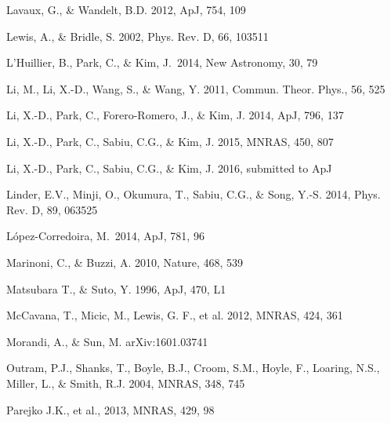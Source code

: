 \documentclass[iop]{emulateapj}
\begin{document}
\begin{thebibliography}{}
Lavaux, G., \& Wandelt, B.D. 2012, ApJ, 754, 109  


Lewis, A., \& Bridle, S. 2002, Phys. Rev. D, 66, 103511

L'Huillier, B., Park, C., \& Kim, J.\ 2014, New Astronomy, 30, 79 

Li, M., Li, X.-D., Wang, S., \& Wang, Y. 2011, Commun. Theor. Phys., 56, 525

Li, X.-D., Park, C., Forero-Romero, J., \& Kim, J. 2014, ApJ, 796, 137

Li, X.-D., Park, C., Sabiu, C.G., \& Kim, J. 2015, MNRAS, 450, 807 

Li, X.-D., Park, C., Sabiu, C.G., \& Kim, J. 2016, submitted to ApJ



Linder, E.V., Minji, O., Okumura, T., Sabiu, C.G., \& Song, Y.-S. 2014, Phys. Rev. D, 89, 063525  

L{\'o}pez-Corredoira, M.\ 2014, ApJ, 781, 96 

Marinoni, C., \& Buzzi, A. 2010, Nature, 468, 539  

Matsubara T., \& Suto, Y. 1996, ApJ, 470, L1  

McCavana, T., Micic, M., Lewis, G. F., et al. 2012, MNRAS, 424, 361


Morandi, A., \& Sun, M. arXiv:1601.03741


Outram, P.J., Shanks, T., Boyle, B.J., Croom, S.M., Hoyle, F., Loaring, N.S., 
Miller, L., \& Smith, R.J. 2004, MNRAS, 348, 745  


Parejko J.K., et al., 2013, MNRAS, 429, 98


\end{thebibliography}
\end{document}
